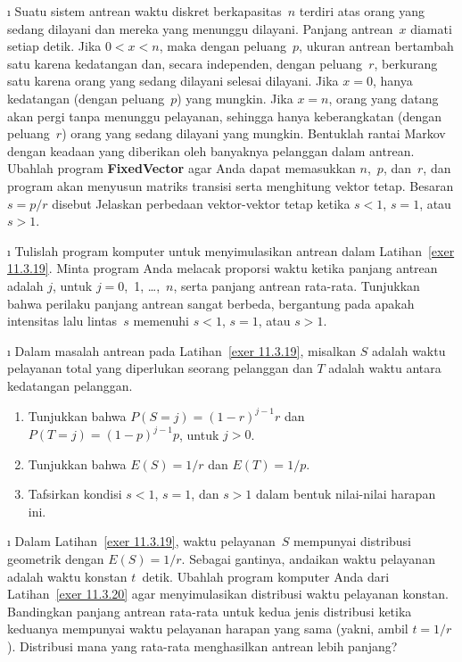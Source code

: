 \begin{LJSItem}
\i\label{exer 11.3.19} Suatu sistem antrean waktu diskret berkapasitas~$n$
terdiri atas orang yang sedang dilayani dan mereka yang menunggu dilayani.
Panjang antrean~$x$ diamati setiap detik. Jika $0 < x < n$, maka dengan
peluang~$p$, ukuran antrean bertambah satu karena kedatangan dan, secara
independen, dengan peluang~$r$, berkurang satu karena orang yang sedang
dilayani selesai dilayani. Jika $x = 0$, hanya kedatangan (dengan peluang~$p$)
yang mungkin. Jika $x = n$, orang yang datang akan pergi tanpa menunggu
pelayanan, sehingga hanya keberangkatan (dengan peluang~$r$) orang yang sedang
dilayani yang mungkin. Bentuklah rantai Markov dengan keadaan yang diberikan
oleh banyaknya pelanggan dalam antrean. Ubahlah program {\bf FixedVector} agar
Anda dapat memasukkan $n$,~$p$, dan~$r$, dan program akan menyusun matriks
transisi serta menghitung vektor tetap. Besaran $s = p/r$ disebut
 Jelaskan perbedaan vektor-vektor tetap ketika
$s < 1$, $s = 1$, atau $s > 1$.

\i\label{exer 11.3.20} Tulislah program komputer untuk menyimulasikan antrean
dalam Latihan~\ref{exer 11.3.19}. Minta program Anda melacak proporsi waktu
ketika panjang antrean adalah $j$, untuk $j = 0$,~1, \ldots,~$n$, serta panjang
antrean rata-rata. Tunjukkan bahwa perilaku panjang antrean sangat berbeda,
bergantung pada apakah intensitas lalu lintas~$s$ memenuhi $s < 1$, $s = 1$,
atau $s > 1$.

\i\label{exer 11.3.21} Dalam masalah antrean pada Latihan~\ref{exer 11.3.19},
misalkan $S$ adalah waktu pelayanan total yang diperlukan seorang pelanggan dan
$T$ adalah waktu antara kedatangan pelanggan.
\begin{enumerate}
\item Tunjukkan bahwa $P(S = j) = (1 - r)^{j - 1}r$ dan $P(T = j) = (1 - p)^{j -
1}p$, untuk $j > 0$.

\item Tunjukkan bahwa $E(S) = 1/r$ dan $E(T) = 1/p$.

\item Tafsirkan kondisi $s < 1$, $s = 1$, dan $s > 1$ dalam bentuk nilai-nilai
harapan ini.
\end{enumerate}

\i\label{exer 11.3.22} Dalam Latihan~\ref{exer 11.3.19}, waktu pelayanan~$S$
mempunyai distribusi geometrik dengan $E(S) = 1/r$. Sebagai gantinya, andaikan
waktu pelayanan adalah waktu konstan $t$~detik. Ubahlah program komputer Anda
dari Latihan~\ref{exer 11.3.20} agar menyimulasikan distribusi waktu pelayanan
konstan. Bandingkan panjang antrean rata-rata untuk kedua jenis distribusi
ketika keduanya mempunyai waktu pelayanan harapan yang sama (yakni, ambil
$t = 1/r$). Distribusi mana yang rata-rata menghasilkan antrean lebih panjang?


\end{LJSItem}
